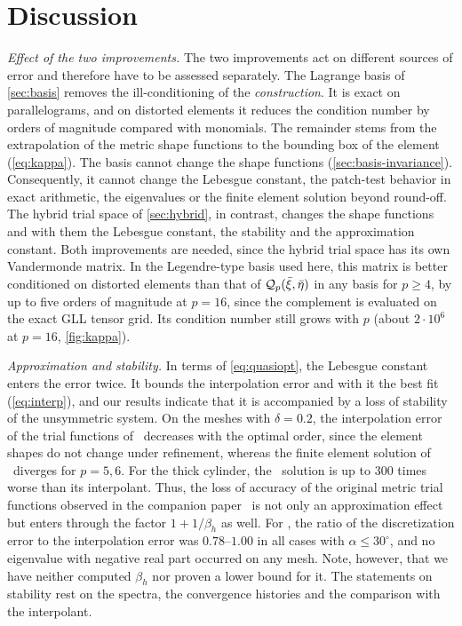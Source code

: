 \section{Discussion}
\label{sec:discussion}
%
\emph{Effect of the two improvements.} The two improvements act on different sources of error and therefore have to be assessed separately. The Lagrange basis of \cref{sec:basis} removes the ill-conditioning of the \emph{construction}. It is exact on parallelograms, and on distorted elements it reduces the condition number by orders of magnitude compared with monomials. The remainder stems from the extrapolation of the metric shape functions to the bounding box of the element (\cref{eq:kappa}). The basis cannot change the shape functions (\cref{sec:basis-invariance}). Consequently, it cannot change the Lebesgue constant, the patch-test behavior in exact arithmetic, the eigenvalues or the finite element solution beyond round-off. The hybrid trial space of \cref{sec:hybrid}, in contrast, changes the shape functions and with them the Lebesgue constant, the stability and the approximation constant. Both improvements are needed, since the hybrid trial space has its own Vandermonde matrix. In the Legendre-type basis used here, this matrix is better conditioned on distorted elements than that of $\mathcal Q_p(\bar\xi,\bar\eta)$ in any basis for $p\ge4$, by up to five orders of magnitude at $p=16$, since the complement is evaluated on the exact GLL tensor grid. Its condition number still grows with $p$ (about $2\cdot10^{6}$ at $p=16$, \cref{fig:kappa}).

\emph{Approximation and stability.} In terms of \cref{eq:quasiopt}, the Lebesgue constant enters the error twice. It bounds the interpolation error and with it the best fit (\cref{eq:interp}), and our results indicate that it is accompanied by a loss of stability of the unsymmetric system. On the meshes with $\delta=0.2$, the interpolation error of the trial functions of \PM\ decreases with the optimal order, since the element shapes do not change under refinement, whereas the finite element solution of \PM\ diverges for $p=5,6$. For the thick cylinder, the \PM\ solution is up to 300 times worse than its interpolant. Thus, the loss of accuracy of the original metric trial functions observed in the companion paper~\cite{Eisentraeger2026axisymmetric} is not only an approximation effect but enters through the factor $1+1/\beta_h$ as well. For \PH, the ratio of the discretization error to the interpolation error was $0.78$--$1.00$ in all cases with $\alpha\le30^\circ$, and no eigenvalue with negative real part occurred on any mesh. Note, however, that we have neither computed $\beta_h$ nor proven a lower bound for it. The statements on stability rest on the spectra, the convergence histories and the comparison with the interpolant.

